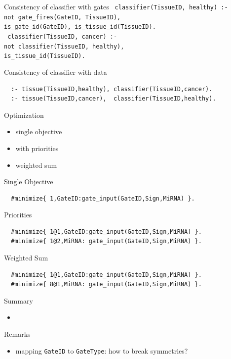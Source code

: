 \documentclass[10pt,dvipsnames]{beamer}
\begin{document}
\begin{frame}{Consistency of classifier with gates}
 \texttt{
  classifier(TissueID, healthy) :-\\
    \quad not gate\_fires(GateID, TissueID),\\
    \quad is\_gate\_id(GateID), is\_tissue\_id(TissueID).\\
 }
 \vspace{1cm}
 \texttt{
  classifier(TissueID, cancer) :-\\
    \quad not classifier(TissueID, healthy),\\
    \quad is\_tissue\_id(TissueID).
 }
\end{frame}

\begin{frame}[fragile]{Consistency of classifier with data}
 \begin{verbatim}
  :- tissue(TissueID,healthy), classifier(TissueID,cancer).
  :- tissue(TissueID,cancer),  classifier(TissueID,healthy).
 \end{verbatim}
\end{frame}


\begin{frame}{Optimization}
 \begin{itemize}
  \item single objective
  \item with priorities
  \item weighted sum
 \end{itemize}
\end{frame}

\begin{frame}[fragile]{Single Objective}
 \begin{verbatim}
  #minimize{ 1,GateID:gate_input(GateID,Sign,MiRNA) }.
 \end{verbatim}
\end{frame}

\begin{frame}[fragile]{Priorities}
 \begin{verbatim}
  #minimize{ 1@1,GateID:gate_input(GateID,Sign,MiRNA) }.
  #minimize{ 1@2,MiRNA: gate_input(GateID,Sign,MiRNA) }.
 \end{verbatim}
\end{frame}

\begin{frame}[fragile]{Weighted Sum}
 \begin{verbatim}
  #minimize{ 1@1,GateID:gate_input(GateID,Sign,MiRNA) }.
  #minimize{ 8@1,MiRNA: gate_input(GateID,Sign,MiRNA) }.
 \end{verbatim}
\end{frame}

\begin{frame}{Summary}
 \begin{itemize}
  \item 
  
 \end{itemize}

\end{frame}



\begin{frame}{Remarks}
 \begin{itemize}
  \item mapping \texttt{GateID} to \texttt{GateType}: how to break symmetries?
 \end{itemize}

\end{frame}
\end{document}
